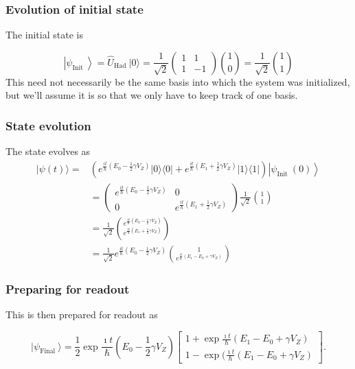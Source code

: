 \documentclass{beamer}
\begin{document}
\begin{frame}
\frametitle{Evolution of initial state}

The initial state is 

\[
\left|\psi_{\text {Init }}\right\rangle=\hat{U}_{\text {Had }}|0\rangle=\frac{1}{\sqrt{2}}\left(\begin{array}{cc}
1 & 1 \\
1 & -1
\end{array}\right)\binom{1}{0}=\frac{1}{\sqrt{2}}\binom{1}{1}
\]
This need not necessarily be the same basis into which the system was initialized, but we'll assume it is so that we only have to keep track of one basis.
\end{frame}

\begin{frame}
\frametitle{State evolution}

The state evolves as
\begin{align*}
|\psi(t)\rangle=&\left(e^{\frac{i t}{\hbar}\left(E_{0}-\frac{1}{2} \gamma V_Z\right)}|0\rangle\langle 0|+e^{\frac{i t}{\hbar}\left(E_{1}+\frac{1}{2} \gamma V_Z\right)}|1\rangle\langle 1|\right)\left|\psi_{\text {Init }}(0)\right\rangle\\
&=\left(\begin{array}{cc}
e^{\frac{i t}{\hbar}\left(E_{0}-\frac{1}{2} \gamma V_Z\right)} & 0 \\
0 & e^{\frac{i t}{\hbar}\left(E_{1}+\frac{1}{2} \gamma V_Z\right)}
\end{array}\right) \frac{1}{\sqrt{2}}\binom{1}{1} \\
& =\frac{1}{\sqrt{2}}\binom{e^{\frac{i t}{\hbar}\left(E_{0}-\frac{1}{2} \gamma V_Z\right)}}{e^{\frac{i t}{\hbar}\left(E_{1}+\frac{1}{2} \gamma V_Z\right)}}\\
&=\frac{1}{\sqrt{2}} e^{\frac{i t}{\hbar}\left(E_{0}-\frac{1}{2} \gamma V_Z\right)}\binom{1}{e^{\frac{i t}{\hbar}\left(E_{1}-E_{0}+\gamma V_Z\right)}}
\end{align*}
\end{frame}

\begin{frame}
\frametitle{Preparing for readout}

This is then prepared for readout as

\[
\vert\psi_{\text {Final }}\rangle=\frac{1}{2} \exp{\frac{\imath t}{\hbar}(E_{0}-\frac{1}{2} \gamma V_Z)}
\begin{bmatrix} 1+\exp{\frac{\imath t}{\hbar}(E_{1}-E_{0}+\gamma V_Z)} \\ 1-\exp{(\frac{\imath t}{\hbar}(E_{1}-E_{0}+\gamma V_Z)}\end{bmatrix}.
\]
\end{frame}
\end{document}
